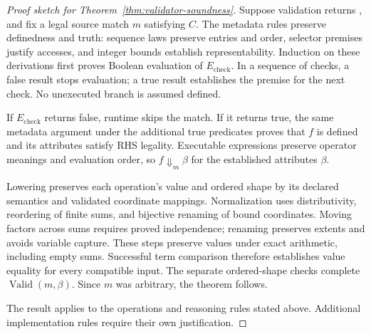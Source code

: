 \begin{proof}[Proof sketch for Theorem~\ref{thm:validator-soundness}]
Suppose validation returns , and fix a legal source match
$m$ satisfying $C$. The metadata rules preserve definedness and truth:
sequence laws preserve entries and order, selector premises justify
accesses, and integer bounds establish representability. Induction on
these derivations first proves Boolean evaluation of $E_{\mathrm{check}}$. In a sequence
of checks, a false result stops evaluation; a true result establishes the
premise for the next check. No unexecuted branch is assumed defined.

If $E_{\mathrm{check}}$ returns false, runtime skips the match. If it returns true, the same metadata
argument under the additional true predicates proves that $f$ is defined
and its attributes satisfy RHS legality. Executable expressions preserve
operator meanings and evaluation order, so $f\Downarrow_m\beta$ for the
established attributes $\beta$.

Lowering preserves each operation's value and ordered shape by its
declared semantics and validated coordinate mappings. Normalization uses
distributivity, reordering of finite sums, and bijective renaming of bound
coordinates. Moving factors across sums requires proved independence;
renaming preserves extents and avoids variable capture. These steps
preserve values under exact arithmetic, including empty sums. Successful
term comparison therefore establishes value equality for every compatible
input. The separate ordered-shape checks complete
$\operatorname{Valid}(m,\beta)$. Since $m$ was arbitrary, the theorem follows.

The result applies to the operations and reasoning rules stated above.
Additional implementation rules require their own justification.
\end{proof}
